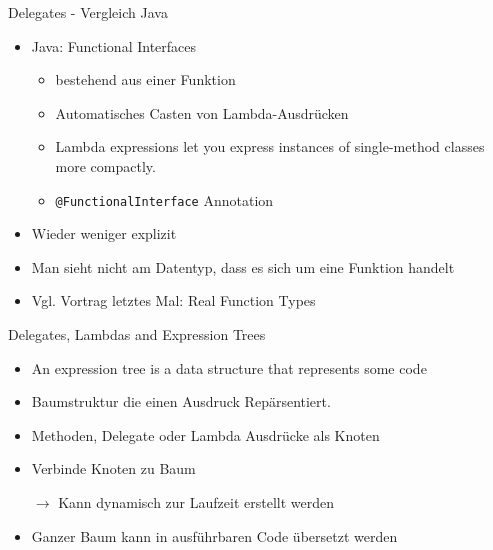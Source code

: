 \documentclass[11pt]{beamer}
\begin{document}
\begin{frame}{Delegates - Vergleich Java}
	\begin{itemize}
		\item Java: Functional Interfaces
		\begin{itemize}
			\item bestehend aus einer Funktion
			\item Automatisches Casten von Lambda-Ausdrücken
			\item \glqq Lambda expressions let you express instances of single-method classes more compactly.\grqq
			\item \texttt{@FunctionalInterface} Annotation		
		\end{itemize}
		\item Wieder weniger explizit
		\item Man sieht nicht am Datentyp, dass es sich um eine Funktion handelt
		\item Vgl. Vortrag letztes Mal: \glqq Real Function Types\grqq
	\end{itemize}
\end{frame}

\begin{frame}{Delegates, Lambdas and Expression Trees}
	\begin{itemize}
		\item \glqq An expression tree is a data structure that represents some code \grqq{}
		\item Baumstruktur die einen Ausdruck Repärsentiert. 
		\item Methoden, Delegate oder Lambda Ausdrücke als Knoten
		\item Verbinde Knoten zu Baum
		\item[$\rightarrow$] Kann dynamisch zur Laufzeit erstellt werden
		\item Ganzer Baum kann in ausführbaren Code übersetzt werden
	\end{itemize}
\end{frame}


\end{document}
